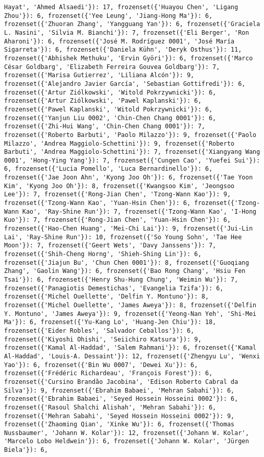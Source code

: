 \documentclass[11pt]{article}
\begin{document}
\begin{verbatim}
Hayat', 'Ahmed Alsaedi'}): 17, frozenset({'Huayou Chen', 'Ligang Zhou'}): 6, frozenset({'Yee Leung', 'Jiang-Hong Ma'}): 6, frozenset({'Zhuoran Zhang', 'Yangguang Yan'}): 6, frozenset({'Graciela L. Nasini', 'Silvia M. Bianchi'}): 7, frozenset({'Eli Berger', 'Ron Aharoni'}): 6, frozenset({'José M. Rodríguez 0001', 'José María Sigarreta'}): 6, frozenset({'Daniela Kühn', 'Deryk Osthus'}): 11, frozenset({'Abhishek Methuku', 'Ervin Györi'}): 6, frozenset({'Marco César Goldbarg', 'Elizabeth Ferreira Gouvea Goldbarg'}): 7, frozenset({'Marisa Gutierrez', 'Liliana Alcón'}): 9, frozenset({'Alejandro Javier García', 'Sebastian Gottifredi'}): 6, frozenset({'Artur Ziólkowski', 'Witold Pokrzywnicki'}): 6, frozenset({'Artur Ziólkowski', 'Pawel Kaplanski'}): 6, frozenset({'Pawel Kaplanski', 'Witold Pokrzywnicki'}): 6, frozenset({'Yanjun Liu 0002', 'Chin-Chen Chang 0001'}): 6, frozenset({'Zhi-Hui Wang', 'Chin-Chen Chang 0001'}): 7, frozenset({'Roberto Barbuti', 'Paolo Milazzo'}): 9, frozenset({'Paolo Milazzo', 'Andrea Maggiolo-Schettini'}): 9, frozenset({'Roberto Barbuti', 'Andrea Maggiolo-Schettini'}): 7, frozenset({'Xiangyang Wang 0001', 'Hong-Ying Yang'}): 7, frozenset({'Cungen Cao', 'Yuefei Sui'}): 6, frozenset({'Lucia Pomello', 'Luca Bernardinello'}): 6, frozenset({'Jae Joon Ahn', 'Kyong Joo Oh'}): 6, frozenset({'Tae Yoon Kim', 'Kyong Joo Oh'}): 8, frozenset({'Kwangsoo Kim', 'Jeongsoo Lee'}): 7, frozenset({'Rong-Jian Chen', 'Tzong-Wann Kao'}): 9, frozenset({'Tzong-Wann Kao', 'Yuan-Hsin Chen'}): 6, frozenset({'Tzong-Wann Kao', 'Ray-Shine Run'}): 7, frozenset({'Tzong-Wann Kao', 'I-Hong Kuo'}): 7, frozenset({'Rong-Jian Chen', 'Yuan-Hsin Chen'}): 6, frozenset({'Hao-Chen Huang', 'Mei-Chi Lai'}): 9, frozenset({'Jui-Lin Lai', 'Ray-Shine Run'}): 10, frozenset({'So Young Sohn', 'Tae Hee Moon'}): 7, frozenset({'Geert Wets', 'Davy Janssens'}): 7, frozenset({'Shih-Cheng Horng', 'Shieh-Shing Lin'}): 6, frozenset({'Jiajun Bu', 'Chun Chen 0001'}): 8, frozenset({'Guoqiang Zhang', 'Gaolin Wang'}): 6, frozenset({'Bao Rong Chang', 'Hsiu Fen Tsai'}): 6, frozenset({'Henry Shu-Hung Chung', 'Weimin Wu'}): 7, frozenset({'Panagiotis Demestichas', 'Evangelia Tzifa'}): 6, frozenset({'Michel Ouellette', 'Delfin Y. Montuno'}): 8, frozenset({'Michel Ouellette', 'James Aweya'}): 8, frozenset({'Delfin Y. Montuno', 'James Aweya'}): 9, frozenset({'Yeong-Nan Yeh', 'Shi-Mei Ma'}): 6, frozenset({'Yu-Kang Lo', 'Huang-Jen Chiu'}): 18, frozenset({'Eider Robles', 'Salvador Ceballos'}): 6, frozenset({'Kiyoshi Ohishi', 'Seiichiro Katsura'}): 9, frozenset({'Kamal Al-Haddad', 'Salem Rahmani'}): 6, frozenset({'Kamal Al-Haddad', 'Louis-A. Dessaint'}): 12, frozenset({'Zhengyu Lu', 'Wenxi Yao'}): 6, frozenset({'Bin Wu 0007', 'Dewei Xu'}): 6, frozenset({'Frédéric Richardeau', 'François Forest'}): 6, frozenset({'Cursino Brandão Jacobina', 'Edison Roberto Cabral da Silva'}): 9, frozenset({'Ebrahim Babaei', 'Mehran Sabahi'}): 6, frozenset({'Ebrahim Babaei', 'Seyed Hossein Hosseini 0002'}): 6, frozenset({'Rasoul Shalchi Alishah', 'Mehran Sabahi'}): 6, frozenset({'Mehran Sabahi', 'Seyed Hossein Hosseini 0002'}): 9, frozenset({'Zhaoming Qian', 'Xinke Wu'}): 6, frozenset({'Thomas Nussbaumer', 'Johann W. Kolar'}): 12, frozenset({'Johann W. Kolar', 'Marcelo Lobo Heldwein'}): 6, frozenset({'Johann W. Kolar', 'Jürgen Biela'}): 6, 
\end{verbatim}
\end{document}
